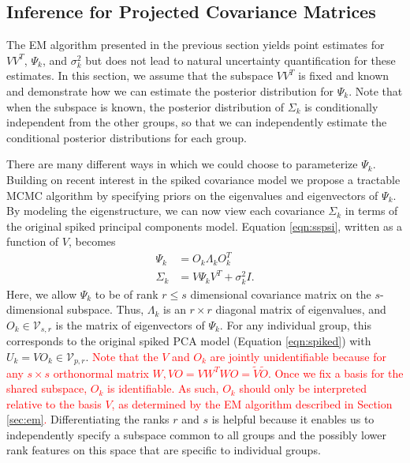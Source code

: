 \documentclass{statsoc}
\newcommand{\edits}[1]{{\textsf{\textcolor{red}{#1}}}}
\newcommand{\edits}[1]{#1}
\begin{document}
\subsection{Inference for Projected Covariance Matrices}
\label{sec:bayes}

The EM algorithm presented in the previous section yields point
estimates for $VV^T$, $\Psi_k$, and $\sigma_k^2$ but does not lead to natural
uncertainty quantification for these estimates.  In this section, we
assume that the subspace $VV^T$ is fixed and known and demonstrate how
we can estimate the posterior distribution for $\Psi_k$.   Note that when
the subspace is known, the posterior distribution of $\Sigma_k$ is
conditionally independent from the other groups, so that we can
independently estimate the conditional posterior distributions for each
group.  


There are many different ways in which we could choose to parameterize
$\Psi_k$.  Building on recent interest in the spiked covariance model
\citep{Donoho2013, Paul2007} we propose a tractable MCMC algorithm by
specifying priors on the eigenvalues and eigenvectors of $\Psi_k$.  By
modeling the eigenstructure, we can now view each covariance
$\Sigma_k$ in terms of the original spiked principal components model.  Equation \ref{eqn:sspsi}, written as a function of
$V$, becomes
%
\begin{align}
\nonumber \Psi_k &= O_k\Lambda_kO_k^T\\
\Sigma_k &= V\Psi_kV^T + \sigma^2_kI.
\label{eqn:ss}
\end{align}
%
\noindent Here, we allow $\Psi_k$ to be of rank $r \leq s$ dimensional
covariance matrix on the $s$-dimensional subspace.  Thus, $\Lambda_k$
is an $r \times r$ diagonal matrix of eigenvalues, and
$O_k \in \mathcal{V}_{s,r}$ is the matrix of eigenvectors of
$\Psi_k$.  
For any individual group, this corresponds to the original spiked PCA
model (Equation \ref{eqn:spiked}) with
$U_k = VO_k \in \mathcal{V}_{p, r}$.  \edits{Note that the $V$ and $O_k$
  are jointly unidentifiable because for any $s \times s$
  orthonormal matrix $W, VO = VW^TWO = \tilde{V}\tilde{O}$. Once we fix a basis
for the shared subspace, $O_k$ is identifiable.  As such, $O_k$
should only be interpreted relative to the basis $V$, as determined by
the EM algorithm described in Section \ref{sec:em}.}  Differentiating the ranks $r$
and $s$ is helpful because it enables us to independently specify a
subspace common to all groups and the possibly lower rank features on
this space that are specific to individual groups.  
\end{document}
